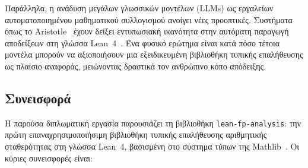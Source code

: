 \documentclass[a4paper,12pt]{article}
\begin{document}
Παράλληλα, η ανάδυση μεγάλων γλωσσικών μοντέλων (LLMs) ως εργαλείων
αυτοματοποιημένου μαθηματικού συλλογισμού ανοίγει νέες προοπτικές. Συστήματα
όπως το Aristotle~\cite{aristotle2025} έχουν δείξει εντυπωσιακή ικανότητα
στην αυτόματη παραγωγή αποδείξεων στη γλώσσα Lean~4~\cite{moura2021lean4}.
Ένα φυσικό ερώτημα είναι κατά πόσο τέτοια μοντέλα μπορούν να αξιοποιήσουν μια
εξειδικευμένη βιβλιοθήκη τυπικής επαλήθευσης ως πλαίσιο αναφοράς, μειώνοντας
δραστικά τον ανθρώπινο κόπο απόδειξης.

\subsection{Συνεισφορά}

Η παρούσα διπλωματική εργασία παρουσιάζει τη βιβλιοθήκη
\texttt{lean-fp-analysis}: την πρώτη επαναχρησιμοποιήσιμη βιβλιοθήκη τυπικής
επαλήθευσης αριθμητικής σταθερότητας στη γλώσσα Lean~4, βασισμένη στο σύστημα
τύπων της Mathlib~\cite{mathlib2020}. Οι κύριες συνεισφορές είναι:
\end{document}
